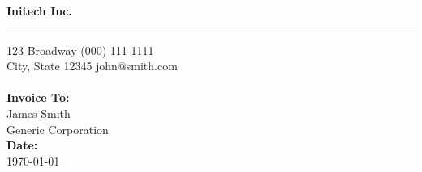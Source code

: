 \documentclass{invoice} %
\def \tab {\hspace*{3ex}} %
\begin{document}

\hfil{\Huge\bf Initech Inc.}\hfil %
\bigskip\break %
\hrule %

123 Broadway \hfill (000) 111-1111 \\ %
City, State 12345 \hfill john@smith.com
\\ \\
{\bf Invoice To:} \\
\tab James Smith \\ %
\tab Generic Corporation \\ %

{\bf Date:} \\
\tab \today \\ %


\begin{invoiceTable}
    
\end{invoiceTable}

\end{document}

